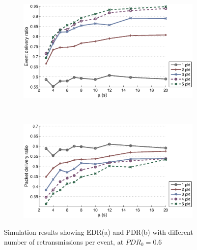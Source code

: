 \begin{figure}[p]
    \centering
    \begin{subfigure}[t]{0.9\textwidth}
        \centering
        \includegraphics[width=\textwidth] {../../sw/pc/matlab/simulation-result/retrans-count-edr-250evt-pdr0.6.eps}
        \caption{}
    \end{subfigure} 
    \\
    \begin{subfigure}[t]{0.9\textwidth}
        \centering
        \includegraphics[width=\textwidth] {../../sw/pc/matlab/simulation-result/retrans-count-pdr-250evt-pdr0.6.eps}
        \caption{}
    \end{subfigure}
    \caption[EDR and PDR with different transmission redundancy, $PDR_0 = 0.6$]{Simulation results showing EDR(a) and PDR(b) with different number of retransmissions per event, at $PDR_0 = 0.6$}\label{fig:retrans-lambda-0.6}
\end{figure}


